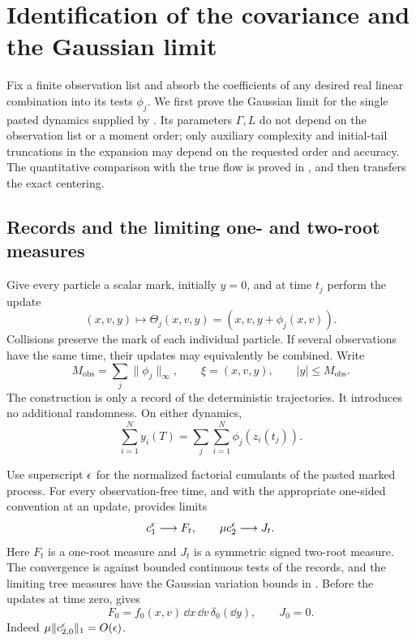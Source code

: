 \section{Identification of the covariance and the Gaussian limit}
\label{sec:gaussian-limit}

Fix a finite observation list and absorb the coefficients of any desired
real linear combination into its tests \(\phi_j\).  We first prove the
Gaussian limit for the single pasted dynamics supplied by
.  Its parameters
\(\Gamma,L\) do not depend on the observation list or a moment order;
only auxiliary complexity and initial-tail truncations in the expansion
may depend on the requested order and accuracy.  The quantitative
comparison with the true flow is proved in , and
 then transfers the exact centering.

\subsection{Records and the limiting one- and two-root measures}

Give every particle a scalar mark, initially \(y=0\), and at time \(t_j\)
perform the update
\begin{equation}\label{eq:limit-mark-update}
 (x,v,y)\longmapsto \Theta_j(x,v,y)
       =(x,v,y+\phi_j(x,v)).
\end{equation}
Collisions preserve the mark of each individual particle.  If several
observations have the same time, their updates may equivalently be
combined.  Write
\[
 M_{\mathrm{obs}}=\sum_j\|\phi_j\|_\infty,
 \qquad \xi=(x,v,y),\qquad |y|\le M_{\mathrm{obs}}.
\]
The construction is only a record of the deterministic trajectories.
It introduces no additional randomness.  On either dynamics,
\begin{equation}\label{eq:limit-record-identity}
        \sum_{i=1}^N y_i(T)
            =\sum_j\sum_{i=1}^N\phi_j(z_i(t_j)).
\end{equation}

Use superscript \(\epsilon\) for the normalized factorial cumulants of the
pasted marked process.  For every observation-free time, and with the
appropriate one-sided convention at an update,
 provides limits
\begin{equation}\label{eq:limit-F-J}
               c_1^\epsilon\longrightarrow F_t,
           \qquad \mu c_2^\epsilon\longrightarrow J_t.
\end{equation}
Here \(F_t\) is a one-root measure and \(J_t\) is a symmetric signed
two-root measure.  The convergence is against bounded continuous tests
of the records, and the limiting tree measures have the Gaussian
variation bounds in .
Before the updates at time zero,  gives
\begin{equation}\label{eq:limit-initial-F-J}
                 F_0=f_0(x,v)\,\dd x\,\dd v\,\delta_0(\dd y),
                 \qquad J_0=0.
\end{equation}
Indeed \(\mu\|c_{2,0}^{\epsilon}\|_1=O(\epsilon)\).

